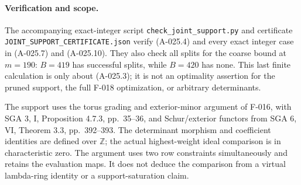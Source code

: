 \paragraph{Verification and scope.}
The accompanying exact-integer script
\texttt{check\_joint\_support.py} and certificate
\texttt{JOINT\_SUPPORT\_CERTIFICATE.json} verify (A-025.4)
and every exact integer case in (A-025.7) and (A-025.10).
They also check all splits for the coarse bound at $m=190$:
$B=419$ has successful splits, while $B=420$ has none.
This last finite calculation is only about (A-025.3);
it is not an optimality assertion for the pruned support,
the full F-018 optimization, or arbitrary determinants.

The support uses the torus grading and exterior-minor argument
of F-016, with SGA 3, I, Proposition 4.7.3, pp.~35--36,
and Schur/exterior functors from SGA 6, VI, Theorem 3.3,
pp.~392--393. The determinant morphism and coefficient
identities are defined over $\mathbb Z$; the actual
highest-weight ideal comparison is in characteristic zero.
The argument uses two row constraints simultaneously and
retains the evaluation maps. It does not deduce the comparison
from a virtual lambda-ring identity or a support-saturation claim.
